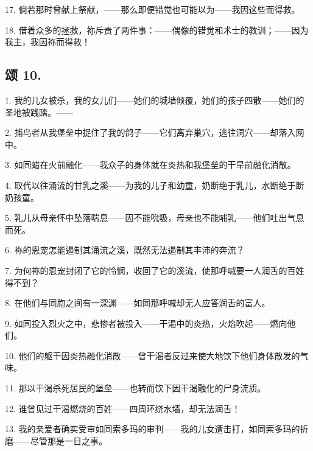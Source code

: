 17. 倘若那时曾献上祭献，——那么即便错觉也可能以为——我因这些而得救。\par

18. 借着众多的拯救，祢斥责了两件事：——偶像的错觉和术士的教训；——因为我主，我因祢而得救！\par


\subsection{颂 10.}

1. 我的儿女被杀，我的女儿们——她们的城墙倾覆，她们的孩子四散——她们的圣地被践踏。——\par

2. 捕鸟者从我堡垒中捉住了我的鸽子——它们离弃巢穴，逃往洞穴——却落入网中。\par

3. 如同蜡在火前融化——我众子的身体就在炎热和我堡垒的干旱前融化消散。\par

4. 取代以往涌流的甘乳之溪——为我的儿子和幼童，奶断绝于乳儿，水断绝于断奶孩童。\par

5. 乳儿从母亲怀中坠落喘息——因不能吮吸，母亲也不能哺乳——他们吐出气息而死。\par

6. 祢的恩宠怎能遏制其涌流之溪，既然无法遏制其丰沛的奔流？\par

7. 为何祢的恩宠封闭了它的怜悯，收回了它的溪流，使那呼喊要一人润舌的百姓得不到？\par

8. 在他们与同胞之间有一深渊——如同那呼喊却无人应答润舌的富人。\par

9. 如同投入烈火之中，悲惨者被投入——干渴中的炎热，火焰吹起——燃向他们。\par

10. 他们的躯干因炎热融化消散——曾干渴者反过来使大地饮下他们身体散发的气味。\par

11. 那以干渴杀死居民的堡垒——也转而饮下因干渴融化的尸身流质。\par

12. 谁曾见过干渴燃烧的百姓——四周环绕水墙，却无法润舌！\par

13. 我的亲爱者确实受审如同索多玛的审判——我的儿女遭击打，如同索多玛的折磨——尽管那是一日之事。\par

